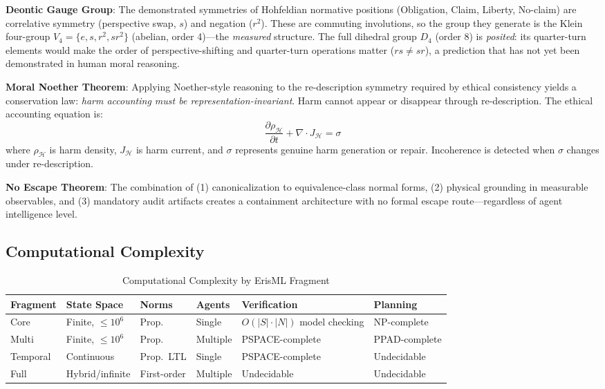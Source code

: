 \documentclass[conference]{IEEEtran}
\begin{document}
\textbf{Deontic Gauge Group}: The demonstrated symmetries of Hohfeldian normative positions (Obligation, Claim, Liberty, No-claim) are correlative symmetry (perspective swap, $s$) and negation ($r^2$). These are commuting involutions, so the group they generate is the Klein four-group $V_4 = \{e, s, r^2, sr^2\}$ (abelian, order 4)---the \emph{measured} structure. The full dihedral group $D_4$ (order 8) is \emph{posited}: its quarter-turn elements would make the order of perspective-shifting and quarter-turn operations matter ($rs \neq sr$), a prediction that has not yet been demonstrated in human moral reasoning.

\textbf{Moral Noether Theorem}: Applying Noether-style reasoning to the re-description symmetry required by ethical consistency yields a conservation law: \emph{harm accounting must be representation-invariant}. Harm cannot appear or disappear through re-description. The ethical accounting equation is:
\begin{equation}
\frac{\partial \rho_\mathcal{H}}{\partial t} + \nabla \cdot J_\mathcal{H} = \sigma
\end{equation}
where $\rho_\mathcal{H}$ is harm density, $J_\mathcal{H}$ is harm current, and $\sigma$ represents genuine harm generation or repair. Incoherence is detected when $\sigma$ changes under re-description.

\textbf{No Escape Theorem}: The combination of (1) canonicalization to equivalence-class normal forms, (2) physical grounding in measurable observables, and (3) mandatory audit artifacts creates a containment architecture with no formal escape route---regardless of agent intelligence level.

\subsection{Computational Complexity}

\begin{table}[t]
\caption{Computational Complexity by ErisML Fragment}
\label{tab:complexity}
\centering
\footnotesize
\begin{tabular}{@{}p{1.2cm}p{1.3cm}p{0.8cm}p{0.6cm}p{1.5cm}p{1.2cm}@{}}
\toprule
Fragment & State Space & Norms & Agents & Verification & Planning \\
\midrule
Core & Finite, $\leq 10^6$ & Prop. & Single & $O(|S|\cdot|N|)$ model checking & NP-complete \\
Multi & Finite, $\leq 10^6$ & Prop. & Multiple & PSPACE-complete & PPAD-complete \\
Temporal & Continuous & Prop.\ LTL & Single & PSPACE-complete & Undecidable \\
Full & Hybrid/infinite & First-order & Multiple & Undecidable & Undecidable \\
\bottomrule
\end{tabular}
\end{table}
\end{document}
